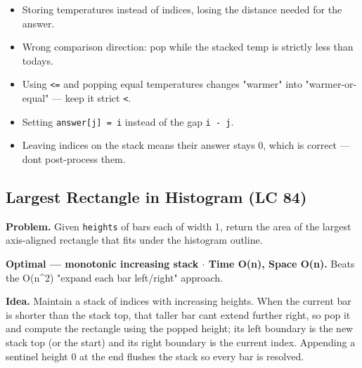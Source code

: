 \documentclass[11pt]{article}
\providecommand{\tightlist}{\setlength{\itemsep}{1pt}\setlength{\parskip}{0pt}}
\begin{document}
\begin{itemize}
\tightlist
\item
  Storing temperatures instead of indices, losing the distance needed for the answer.
\item
  Wrong comparison direction: pop while the stacked temp is strictly less than today\textquotesingle s.
\item
  Using \texttt{\textless{}=} and popping equal temperatures changes "warmer" into "warmer-or-equal" --- keep it strict \texttt{\textless{}}.
\item
  Setting \texttt{answer{[}j{]}\ =\ i} instead of the gap \texttt{i\ -\ j}.
\item
  Leaving indices on the stack means their answer stays 0, which is correct --- don\textquotesingle t post-process them.
\end{itemize}

\subsection{Largest Rectangle in Histogram (LC 84)}\label{largest-rectangle-in-histogram-lc-84}

\textbf{Problem.} Given \texttt{heights} of bars each of width 1, return the area of the largest axis-aligned rectangle that fits under the histogram outline.

\textbf{Optimal --- monotonic increasing stack \(\cdot\) Time O(n), Space O(n).} Beats the O(n\^{}2) "expand each bar left/right" approach.

\textbf{Idea.} Maintain a stack of indices with increasing heights. When the current bar is shorter than the stack top, that taller bar can\textquotesingle t extend further right, so pop it and compute the rectangle using the popped height; its left boundary is the new stack top (or the start) and its right boundary is the current index. Appending a sentinel height 0 at the end flushes the stack so every bar is resolved.

\end{document}
